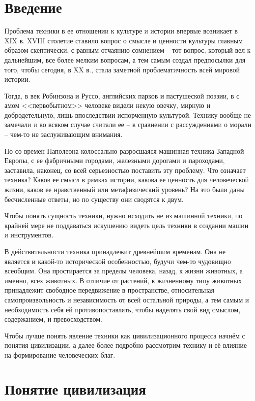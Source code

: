 \section{Введение}

Проблема техники в ее отношении к культуре и истории впервые возникает в 
XIX в. XVIII столетие ставило вопрос о смысле и ценности культуры главным 
образом скептически, с равным отчаянию сомнением -- тот вопрос, который вел к 
дальнейшим, все более мелким вопросам, а тем самым создал предпосылки для 
того, чтобы сегодня, в XX в., стала заметной проблематичность всей мировой 
истории.

Тогда, в век Робинзона и Руссо, английских парков и пастушеской поэзии, в с
амом <<первобытном>> человеке видели некую овечку, мирную и добродетельную, 
лишь впоследствии испорченную культурой. Технику вообще не замечали и во 
всяком случае считали ее -- в сравнении с рассуждениями о морали -- чем-то не 
заслуживающим внимания.

Но со времен Наполеона колоссально разросшаяся машинная техника Западной 
Европы, с ее фабричными городами, железными дорогами и пароходами, заставила, 
наконец, со всей серьезностью поставить эту проблему. Что означает техника? 
Каков ее смысл в рамках истории, какова ее ценность для человеческой жизни, 
каков ее нравственный или метафизический уровень? На это были даны 
бесчисленные ответы, но по существу они сводятся к двум.

Чтобы понять сущность техники, нужно исходить не из машинной техники, по 
крайней мере не поддаваться искушению видеть цель техники в создании машин и 
инструментов.

В действительности техника принадлежит древнейшим временам. Она не является и 
какой-то исторической особенностью, будучи чем-то чудовищно всеобщим. Она 
простирается за пределы человека, назад, к жизни животных, а именно, всех 
животных. В отличие от растений, к жизненному типу животных принадлежит 
свободное передвижение в пространстве, относительная самопроизвольность и 
независимость от всей остальной природы, а тем самым и необходимость себя ей 
противопоставлять, чтобы наделять свой вид смыслом, содержанием, и 
превосходством. \cite{bib:06}

Чтобы лучше понять явление техники как цивилизационного процесса начнём с 
понятия цивилизации, а далее более подробно рассмотрим технику и её влияние 
на формирование человеческих благ.

\newpage

\section{Понятие цивилизация}

